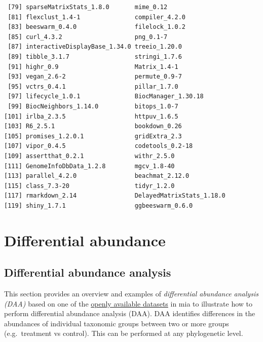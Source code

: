 \documentclass[
]{book}
\begin{document}
\begin{verbatim}
 [79] sparseMatrixStats_1.8.0       mime_0.12                    
 [81] flexclust_1.4-1               compiler_4.2.0               
 [83] beeswarm_0.4.0                filelock_1.0.2               
 [85] curl_4.3.2                    png_0.1-7                    
 [87] interactiveDisplayBase_1.34.0 treeio_1.20.0                
 [89] tibble_3.1.7                  stringi_1.7.6                
 [91] highr_0.9                     Matrix_1.4-1                 
 [93] vegan_2.6-2                   permute_0.9-7                
 [95] vctrs_0.4.1                   pillar_1.7.0                 
 [97] lifecycle_1.0.1               BiocManager_1.30.18          
 [99] BiocNeighbors_1.14.0          bitops_1.0-7                 
[101] irlba_2.3.5                   httpuv_1.6.5                 
[103] R6_2.5.1                      bookdown_0.26                
[105] promises_1.2.0.1              gridExtra_2.3                
[107] vipor_0.4.5                   codetools_0.2-18             
[109] assertthat_0.2.1              withr_2.5.0                  
[111] GenomeInfoDbData_1.2.8        mgcv_1.8-40                  
[113] parallel_4.2.0                beachmat_2.12.0              
[115] class_7.3-20                  tidyr_1.2.0                  
[117] rmarkdown_2.14                DelayedMatrixStats_1.18.0    
[119] shiny_1.7.1                   ggbeeswarm_0.6.0             
\end{verbatim}

\hypertarget{differential-abundance}{%
\chapter{Differential abundance}\label{differential-abundance}}

\hypertarget{differential-abundance-analysis}{%
\section{Differential abundance analysis}\label{differential-abundance-analysis}}

This section provides an overview and examples of \emph{differential
abundance analysis (DAA)} based on one of the \href{https://microbiome.github.io/mia/reference/mia-datasets.html}{openly available
datasets}
in mia to illustrate how to perform differential abundance analysis
(DAA). DAA identifies differences in the abundances of individual
taxonomic groups between two or more groups (e.g.~treatment vs
control). This can be performed at any phylogenetic level.
\end{document}
